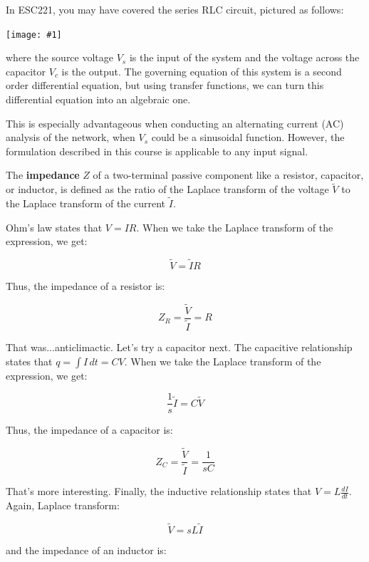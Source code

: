 \documentclass{report}
\newcommand{\bicture}[1]{
\begin{center}
    {\texttt{[image: \#1]}}
\end{center}}
\begin{document}
\begin{onehalfspacing}
\begin{flushleft}
In ESC221, you may have covered the series RLC circuit, pictured as follows:

\bicture{6_rlc}

where the source voltage \(V_s\) is the input of the system and the voltage across the capacitor \(V_c\) is the output. The governing equation of this system is a second order differential equation, but using transfer functions, we can turn this differential equation into an algebraic one.

\medskip

This is especially advantageous when conducting an alternating current (AC) analysis of the network, when \(V_s\) could be a sinusoidal function. However, the formulation described in this course is applicable to any input signal.

\medskip

The \textbf{impedance} \(Z\) of a two-terminal passive component like a resistor, capacitor, or inductor, is defined as the ratio of the Laplace transform of the voltage \(\tilde{V}\) to the Laplace transform of the current \(\tilde{I}\).

\medskip

Ohm's law states that \(V = IR\). When we take the Laplace transform of the expression, we get:

\vspace{-0.1in}
\[\tilde{V} = \tilde{I} R\]

Thus, the impedance of a resistor is:

\vspace{-0.1in}
\[Z_R = \frac{\tilde{V}}{\tilde{I}} = R\]

That was...anticlimactic. Let's try a capacitor next. The capacitive relationship states that \(q = \int I \, dt = CV\). When we take the Laplace transform of the expression, we get:

\vspace{-0.1in}
\[\frac{1}{s} \tilde{I} = C\tilde{V}\]

Thus, the impedance of a capacitor is:

\vspace{-0.1in}
\[Z_C = \frac{\tilde{V}}{\tilde{I}} = \frac{1}{sC}\]

That's more interesting. Finally, the inductive relationship states that \(V = L\frac{dI}{dt}\). Again, Laplace transform:

\vspace{-0.1in}
\[\tilde{V} = s L\tilde{I}\]

and the impedance of an inductor is:


\end{flushleft}
\end{onehalfspacing}
\end{document}
